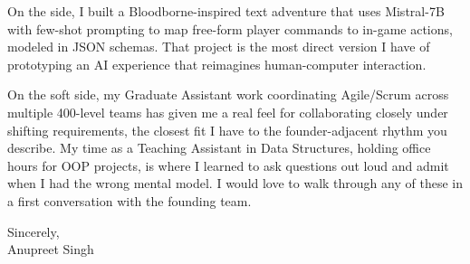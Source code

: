 \documentclass[letterpaper,11pt]{article}
\begin{document}
On the side, I built a Bloodborne-inspired text adventure that uses Mistral-7B with few-shot prompting to map free-form player commands to in-game actions, modeled in JSON schemas. That project is the most direct version I have of prototyping an AI experience that reimagines human-computer interaction.

On the soft side, my Graduate Assistant work coordinating Agile/Scrum across multiple 400-level teams has given me a real feel for collaborating closely under shifting requirements, the closest fit I have to the founder-adjacent rhythm you describe. My time as a Teaching Assistant in Data Structures, holding office hours for OOP projects, is where I learned to ask questions out loud and admit when I had the wrong mental model. I would love to walk through any of these in a first conversation with the founding team.

\vspace{6pt}
Sincerely, \\
Anupreet Singh
\end{document}
